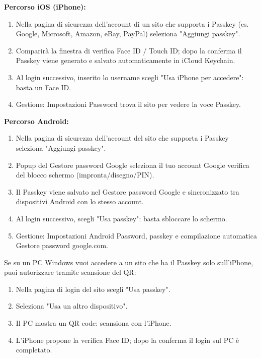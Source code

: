 
\textbf{Percorso iOS (iPhone):}

\begin{enumerate}
  \item Nella pagina di sicurezza dell'account di un sito che supporta i Passkey (es. Google, Microsoft, Amazon, eBay, PayPal) seleziona "Aggiungi passkey".
  \item Comparirà la finestra di verifica Face ID / Touch ID; dopo la conferma il Passkey viene generato e salvato automaticamente in iCloud Keychain.
  \item Al login successivo, inserito lo username scegli "Usa iPhone per accedere": basta un Face ID.
  \item Gestione: Impostazioni Password trova il sito per vedere la voce Passkey.
\end{enumerate}

\textbf{Percorso Android:}

\begin{enumerate}
  \item Nella pagina di sicurezza dell'account del sito che supporta i Passkey seleziona "Aggiungi passkey".
  \item Popup del Gestore password Google seleziona il tuo account Google verifica del blocco schermo (impronta/disegno/PIN).
  \item Il Passkey viene salvato nel Gestore password Google e sincronizzato tra dispositivi Android con lo stesso account.
  \item Al login successivo, scegli "Usa passkey": basta sbloccare lo schermo.
  \item Gestione: Impostazioni Android Password, passkey e compilazione automatica Gestore password google.com.
\end{enumerate}


Se su un PC Windows vuoi accedere a un sito che ha il Passkey solo sull'iPhone, puoi autorizzare tramite scansione del QR:

\begin{enumerate}
  \item Nella pagina di login del sito scegli "Usa passkey".
  \item Seleziona "Usa un altro dispositivo".
  \item Il PC mostra un QR code: scansiona con l'iPhone.
  \item L'iPhone propone la verifica Face ID; dopo la conferma il login sul PC è completato.
\end{enumerate}

